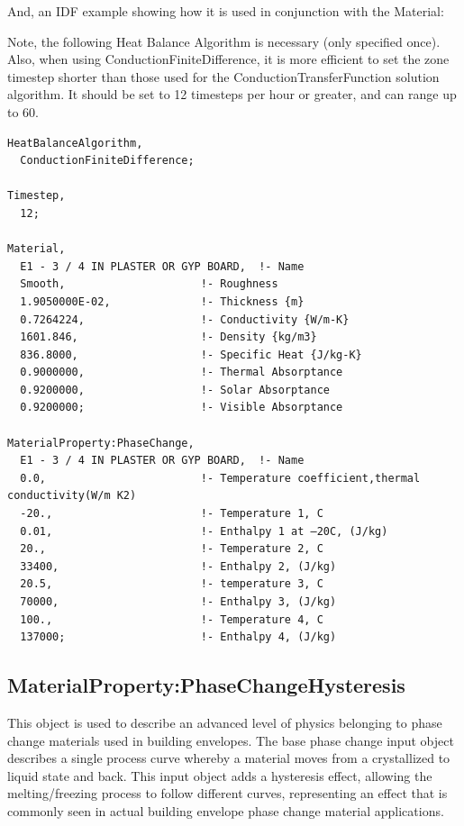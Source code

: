 And, an IDF example showing how it is used in conjunction with the Material:

Note, the following Heat Balance Algorithm is necessary (only specified once). Also, when using ConductionFiniteDifference, it is more efficient to set the zone timestep shorter than those used for the ConductionTransferFunction solution algorithm. It should be set to 12 timesteps per hour or greater, and can range up to 60.

\begin{lstlisting}
HeatBalanceAlgorithm,
  ConductionFiniteDifference;

Timestep,
  12;

Material,
  E1 - 3 / 4 IN PLASTER OR GYP BOARD,  !- Name
  Smooth,                     !- Roughness
  1.9050000E-02,              !- Thickness {m}
  0.7264224,                  !- Conductivity {W/m-K}
  1601.846,                   !- Density {kg/m3}
  836.8000,                   !- Specific Heat {J/kg-K}
  0.9000000,                  !- Thermal Absorptance
  0.9200000,                  !- Solar Absorptance
  0.9200000;                  !- Visible Absorptance

MaterialProperty:PhaseChange,
  E1 - 3 / 4 IN PLASTER OR GYP BOARD,  !- Name
  0.0,                        !- Temperature coefficient,thermal conductivity(W/m K2)
  -20.,                       !- Temperature 1, C
  0.01,                       !- Enthalpy 1 at –20C, (J/kg)
  20.,                        !- Temperature 2, C
  33400,                      !- Enthalpy 2, (J/kg)
  20.5,                       !- temperature 3, C
  70000,                      !- Enthalpy 3, (J/kg)
  100.,                       !- Temperature 4, C
  137000;                     !- Enthalpy 4, (J/kg)
\end{lstlisting}

\subsection{MaterialProperty:PhaseChangeHysteresis}\label{materialpropertyphasechangehysteresis}

This object is used to describe an advanced level of physics belonging to phase change materials used in building envelopes. The base phase change input object describes a single process curve whereby a material moves from a crystallized to liquid state and back. This input object adds a hysteresis effect, allowing the melting/freezing process to follow different curves, representing an effect that is commonly seen in actual building envelope phase change material applications.


